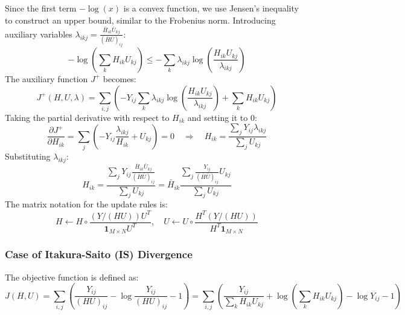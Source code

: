 \documentclass[12pt,a4paper]{article}
\begin{document}
Since the first term $-\log(x)$ is a convex function, we use Jensen's inequality to construct an upper bound, similar to the Frobenius norm. Introducing auxiliary variables $\lambda_{ikj} = \frac{\bar{H}_{ik}\bar{U}_{kj}}{(\bar{H}\bar{U})_{ij}}$:
\begin{equation}
- \log \left( \sum_k H_{ik}U_{kj} \right) \leq - \sum_k \lambda_{ikj} \log \left( \frac{H_{ik}U_{kj}}{\lambda_{ikj}} \right)
\end{equation}
The auxiliary function $J^+$ becomes:
\begin{equation}
J^+(H, U, \lambda) = \sum_{i,j} \left( - Y_{ij} \sum_k \lambda_{ikj} \log \left( \frac{H_{ik}U_{kj}}{\lambda_{ikj}} \right) + \sum_k H_{ik}U_{kj} \right)
\end{equation}
Taking the partial derivative with respect to $H_{ik}$ and setting it to 0:
\begin{equation}
\frac{\partial J^+}{\partial H_{ik}} = \sum_j \left( - Y_{ij} \frac{\lambda_{ikj}}{H_{ik}} + U_{kj} \right) = 0 \quad \Rightarrow \quad H_{ik} = \frac{\sum_j Y_{ij} \lambda_{ikj}}{\sum_j U_{kj}}
\end{equation}
Substituting $\lambda_{ikj}$:
\begin{equation}
H_{ik} = \frac{\sum_j Y_{ij} \frac{\bar{H}_{ik} \bar{U}_{kj}}{(\bar{H}\bar{U})_{ij}}}{\sum_j U_{kj}} = \bar{H}_{ik} \frac{\sum_j \frac{Y_{ij}}{(\bar{H}\bar{U})_{ij}} U_{kj}}{\sum_j U_{kj}}
\end{equation}
The matrix notation for the update rules is:
\begin{equation}
H \leftarrow H \circ \frac{(Y / (HU)) U^T}{\mathbf{1}_{M \times N} U^T}, \quad U \leftarrow U \circ \frac{H^T (Y / (HU))}{H^T \mathbf{1}_{M \times N}}
\end{equation}

\subsubsection*{Case of Itakura-Saito (IS) Divergence}
The objective function is defined as:
\begin{equation}
J(H, U) = \sum_{i,j} \left( \frac{Y_{ij}}{(HU)_{ij}} - \log \frac{Y_{ij}}{(HU)_{ij}} - 1 \right) = \sum_{i,j} \left( \frac{Y_{ij}}{\sum_k H_{ik}U_{kj}} + \log \left(\sum_k H_{ik}U_{kj}\right) - \log Y_{ij} - 1 \right)
\end{equation}
\end{document}
